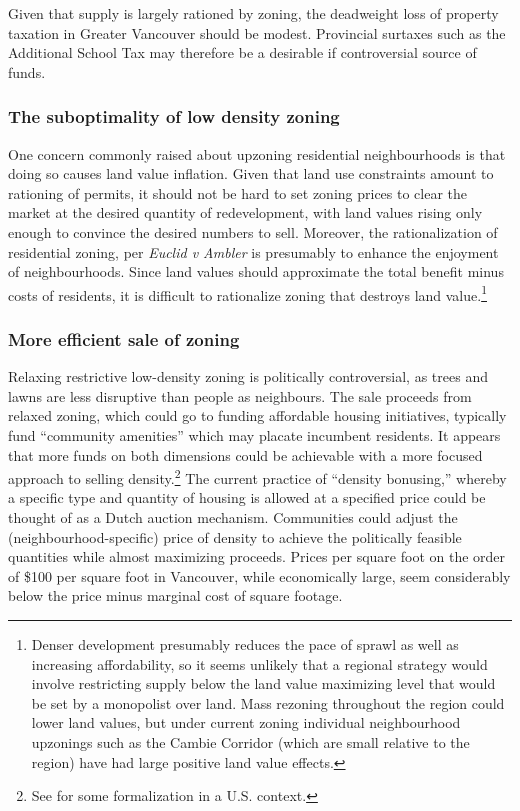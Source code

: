 \documentclass[12pt]{article}
\begin{document}
Given that supply is largely rationed by zoning, the deadweight loss of property taxation in Greater Vancouver should be modest. Provincial surtaxes such as the Additional School Tax may therefore be a desirable if controversial source of funds.

\subsubsection{The suboptimality of low density zoning}

One concern commonly raised about upzoning residential neighbourhoods is that doing so causes land value inflation. Given that land use constraints amount to rationing of permits, it should not be hard to set zoning prices to clear the market at the desired quantity of redevelopment, with land values rising only enough to convince the desired numbers to sell. Moreover, the rationalization of residential zoning, per \emph{Euclid v Ambler} is presumably to enhance the enjoyment of neighbourhoods. Since land values should approximate the total benefit minus costs of residents, it is difficult to rationalize zoning that destroys land value.\footnote{Denser development presumably reduces the pace of sprawl as well as increasing affordability, so it seems unlikely that a regional strategy would involve restricting supply below the land value maximizing level that would be set by a monopolist over land. Mass rezoning throughout the region could lower land values, but under current zoning individual neighbourhood upzonings such as the Cambie Corridor (which are small relative to the region) have had large positive land value effects.}

\subsubsection{More efficient sale of zoning}

Relaxing restrictive low-density zoning is politically controversial, as trees and lawns are less disruptive than people as neighbours. The sale proceeds from relaxed zoning, which could go to funding affordable housing initiatives, typically fund ``community amenities'' which may placate incumbent residents. It appears that more funds on both dimensions could be achievable with a more focused approach to selling density.\footnote{See \textcite{Elmendorf} for some formalization in a U.S. context.}  The current practice of ``density bonusing,'' whereby a specific type and quantity of housing is allowed at a specified price could be thought of as a Dutch auction mechanism. Communities could adjust the (neighbourhood-specific) price of density to achieve the politically feasible quantities while almost maximizing proceeds. Prices per square foot on the order of \$100 per square foot in Vancouver, while economically large, seem considerably below the price minus marginal cost of square footage.
\end{document}
